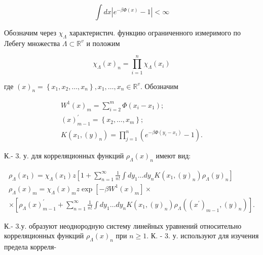 \documentclass[10pt]{article}
\begin{document}
\[

\int d x\left|e^{-\beta \Phi(x)}-1\right|<\infty

\]



Обозначим через $\chi_{\Lambda}$ характеристич. функцию ограниченного измеримого по Лебегу множества $\Lambda \subset \mathbb{R}^{v}$ и положим



\[

\chi_{\Lambda}(x)_{n}=\prod_{i=1}^{n} \chi_{\Lambda}\left(x_{i}\right)

\]



где $(x)_{n}=\left\{x_{1}, x_{2}, \ldots, x_{n}\right\}, x_{1}, \ldots, x_{n} \in \mathbb{R}^{v}$. Обозначим



\[

\begin{gathered}

W^{1}(x)_{m}=\sum_{i=2}^{m} \Phi\left(x_{i}-x_{1}\right) ; \\

(x)_{m-1}^{\prime}=\left\{x_{2}, \ldots, x_{m}\right\} ; \\

K\left(x_{1},(y)_{n}\right)=\prod_{j=1}^{n}\left(e^{-\beta \Phi\left(y_{i}-x_{1}\right)}-1\right) .

\end{gathered}

\]



К.- 3. у. для корреляционных функций $\rho_{\Lambda}(x)_{n}$ имеют вид:



\[

\begin{gathered}

\rho_{\Lambda}\left(x_{1}\right)=\chi_{\Lambda}\left(x_{1}\right) z\left[1+\sum_{n=1}^{\infty} \frac{1}{n !} \int d y_{1} \ldots d y_{n} K\left(x_{1},(y)_{n}\right) \rho_{\Lambda}(y)_{n}\right] \\

\rho_{\Lambda}(x)_{m}=\chi_{\Lambda}(x)_{m} z \exp \left[-\beta W^{1}(x)_{m}\right] \times \\

\times\left[\rho_{\Lambda}(x)_{m-1}^{\prime}+\sum_{n=1}^{\infty} \frac{1}{n !} \int d y_{1} \ldots d y_{n} K\left(x_{1},(y)_{n}\right) \rho_{\Lambda}\left(\left(x^{\prime}\right)_{m-1},(y)_{n}\right)\right] .

\end{gathered}

\]



К.- 3.у. образуют неоднородную систему линейных уравнений относительно корреляционных функций $\rho_{\Lambda}(x)_{n}$ при $n \geqslant 1$. К. - 3. у. используют для изучения предела корреля-
\end{document}
